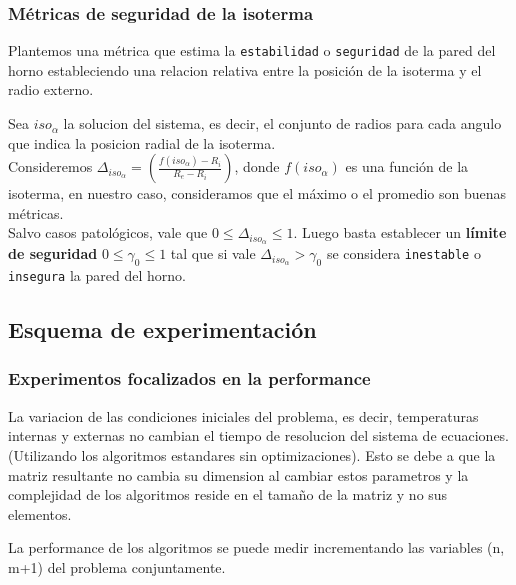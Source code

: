 \subsubsection{Métricas de seguridad de la isoterma}
Plantemos una métrica que estima la \texttt{estabilidad} o \texttt{seguridad} de la pared del horno estableciendo una relacion relativa entre la posición de la isoterma y el radio externo. 
\begin{proposition} Sea $iso_\alpha$ la solucion del sistema, es decir, el conjunto de radios para cada angulo que indica la posicion radial de la isoterma.\\
    Consideremos $\Delta_{iso_\alpha} = \left( \frac{f(iso_\alpha) - R_i}{R_e - R_i} \right)$, donde $f(iso_\alpha)$ es una función de la isoterma, en nuestro caso, consideramos que el máximo o el promedio son buenas métricas.\\
    Salvo casos patológicos, vale que $0 \leq \Delta_{iso_\alpha}\leq 1$. Luego basta establecer un \textbf{límite de seguridad} $0 \leq \gamma_0 \leq 1$ tal que si vale $\Delta_{iso_\alpha} > \gamma_0$ se considera \texttt{inestable} o \texttt{insegura} la pared del horno.
\end{proposition}

\subsection{Esquema de experimentación}
\subsubsection{Experimentos focalizados en la performance}

\begin{proposition} La variacion de las condiciones iniciales del problema, es decir, temperaturas internas y externas no cambian el tiempo de resolucion del sistema de ecuaciones.(Utilizando los algoritmos estandares sin optimizaciones). Esto se debe a que la matriz resultante no cambia su dimension al cambiar estos parametros y la complejidad de los algoritmos reside en el tamaño de la matriz y no sus elementos.
\end{proposition}

\begin{proposition} La performance de los algoritmos se puede medir incrementando las variables (n, m+1) del problema conjuntamente.
\end{proposition}

